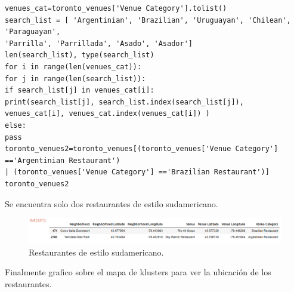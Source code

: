 \documentclass[10pt,a4paper,arial, spanish]{article}
\begin{document}
\begin{verbatim}
venues_cat=toronto_venues['Venue Category'].tolist()
search_list = [ 'Argentinian', 'Brazilian', 'Uruguayan', 'Chilean', 'Paraguayan', 
'Parrilla', 'Parrillada', 'Asado', 'Asador']
len(search_list), type(search_list)
for i in range(len(venues_cat)):
for j in range(len(search_list)):
if search_list[j] in venues_cat[i]:
print(search_list[j], search_list.index(search_list[j]), venues_cat[i], venues_cat.index(venues_cat[i]) )
else:
pass
toronto_venues2=toronto_venues[(toronto_venues['Venue Category'] =='Argentinian Restaurant')
| (toronto_venues['Venue Category'] =='Brazilian Restaurant')]
toronto_venues2
\end{verbatim}
Se encuentra solo dos restaurantes de estilo sudamericano.
\begin{figure}[h]
	\centering
	\includegraphics[scale=0.4]{df7}
	\caption[Restaurantes de estilo sudamericano.]{Restaurantes de estilo sudamericano.}
	\label{fig:df7}
\end{figure}
Finalmente grafico sobre el mapa de klusters para ver la ubicación de los restaurantes.
\end{document}
